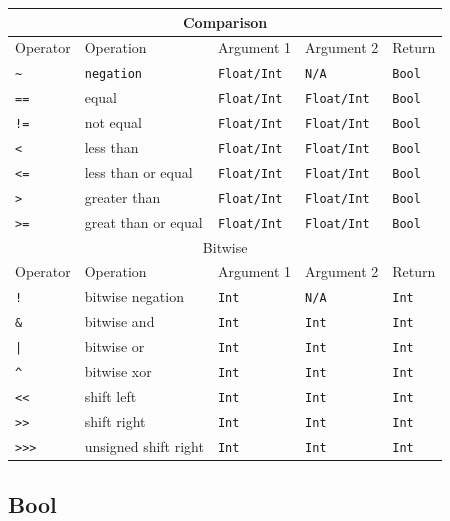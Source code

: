 \documentclass[a4paper,oneside]{book}
\newcommand{\type}[1]{\texttt{#1}}
\newcommand{\expr}[1]{\texttt{#1}}
\begin{document}
\begin{center}
\begin{tabular}{| l | l | l | l | l |}
	\multicolumn{5}{|c|}{Comparison} \\ \hline
	Operator & Operation & Argument 1 & Argument 2 & Return \\ \hline
	\expr{\textasciitilde} & \type{negation} & \type{Float/Int} & \type{N/A} & \type{Bool} \\
	\expr{==} & equal & \type{Float/Int} & \type{Float/Int} & \type{Bool} \\
	\expr{!=} & not equal & \type{Float/Int} & \type{Float/Int} & \type{Bool} \\
	\expr{<} & less than & \type{Float/Int} & \type{Float/Int} & \type{Bool} \\
	\expr{<=} & less than or equal & \type{Float/Int} & \type{Float/Int} & \type{Bool} \\
	\expr{>} & greater than & \type{Float/Int} & \type{Float/Int} & \type{Bool} \\
	\expr{>=} & great than or equal & \type{Float/Int} & \type{Float/Int} & \type{Bool} \\ \hline
	\multicolumn{5}{|c|}{Bitwise} \\ \hline
	Operator & Operation & Argument 1 & Argument 2 & Return \\ \hline
	\expr{!} & bitwise negation & \type{Int} & \type{N/A} & \type{Int} \\	
	\expr{\&} & bitwise and & \type{Int} & \type{Int} & \type{Int} \\	
	\expr{|} & bitwise or & \type{Int} & \type{Int} & \type{Int} \\	
	\expr{\^} & bitwise xor & \type{Int} & \type{Int} & \type{Int} \\	
	\expr{<<} & shift left & \type{Int} & \type{Int} & \type{Int} \\
	\expr{>>} & shift right & \type{Int} & \type{Int} & \type{Int} \\
	\expr{>>>} & unsigned shift right & \type{Int} & \type{Int} & \type{Int} \\ \hline
\end{tabular}
\end{center}

\subsection{Bool}
\label{types-bool}
\end{document}

